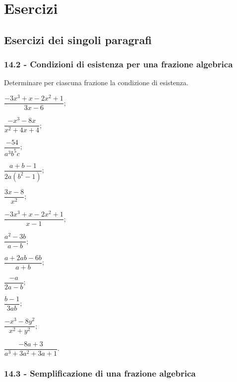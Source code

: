 
\section{Esercizi}
\subsection{Esercizi dei singoli paragrafi}
\subsubsection*{14.2 - Condizioni di esistenza per una frazione algebrica}

\begin{esercizio}[\Ast]
\label{ese:14.1}
Determinare per ciascuna frazione la condizione di esistenza.
\begin{multicols}{3}
\begin{enumeratea}
 \item $\dfrac{-3x^{3}+x-2x^{2}+1}{3x-6}$;
 \item $\dfrac{-x^{3}-8x}{x^{2}+4x+4}$;
 \item $\dfrac{-54}{a^{3}b^{5}c}$;
 \item $\dfrac{a+b-1}{2a \left(b^{2}-1\right)}$;
 \item $\dfrac{3x-8}{x^{2}}$;
 \item $\dfrac{-3x^{3}+x-2x^{2}+1}{x-1}$;
 \item $\dfrac{a^{{2}}-3b}{a-b}$;
 \item $\dfrac{a+2ab-6b}{a+b}$;
 \item $\dfrac{-a}{2a-b}$;
 \item $\dfrac{b-1}{3ab}$;
 \item $\dfrac{-x^{{3}}-8y^{{2}}}{x^{{2}}+y^{{2}}}$;
 \item $\dfrac{-8a+3}{a^{3}+3a^{2}+3a+1}$.
\end{enumeratea}
\end{multicols}
\end{esercizio}

\subsubsection*{14.3 - Semplificazione di una frazione algebrica}

